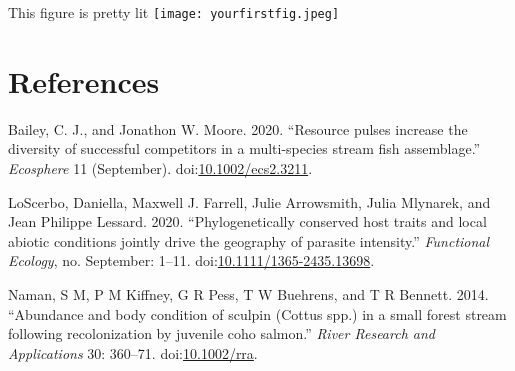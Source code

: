 \documentclass[]{article}
\begin{document}
This figure is pretty lit \texttt{[image: yourfirstfig.jpeg]}

\section{References}\label{references}

\hypertarget{refs}{}
\hypertarget{ref-Bailey2020}{}
Bailey, C. J., and Jonathon W. Moore. 2020. ``Resource pulses increase
the diversity of successful competitors in a multi-species stream fish
assemblage.'' \emph{Ecosphere} 11 (September).
doi:\href{https://doi.org/10.1002/ecs2.3211}{10.1002/ecs2.3211}.

\hypertarget{ref-LoScerbo2020}{}
LoScerbo, Daniella, Maxwell J. Farrell, Julie Arrowsmith, Julia
Mlynarek, and Jean Philippe Lessard. 2020. ``Phylogenetically conserved
host traits and local abiotic conditions jointly drive the geography of
parasite intensity.'' \emph{Functional Ecology}, no. September: 1--11.
doi:\href{https://doi.org/10.1111/1365-2435.13698}{10.1111/1365-2435.13698}.

\hypertarget{ref-Naman2014}{}
Naman, S M, P M Kiffney, G R Pess, T W Buehrens, and T R Bennett. 2014.
``Abundance and body condition of sculpin (Cottus spp.) in a small
forest stream following recolonization by juvenile coho salmon.''
\emph{River Research and Applications} 30: 360--71.
doi:\href{https://doi.org/10.1002/rra}{10.1002/rra}.
\end{document}
